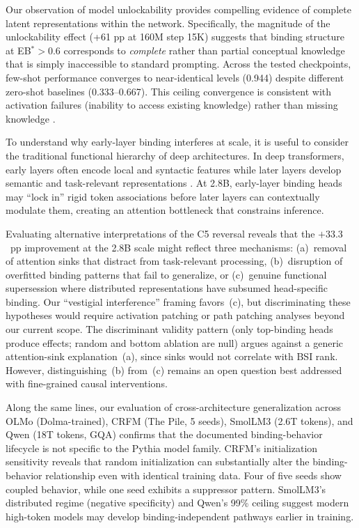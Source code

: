 \documentclass[10pt]{article} %
\begin{document}
Our observation of model unlockability provides compelling evidence of complete latent representations within the network.
Specifically, the magnitude of the unlockability effect (+61 pp at 160M step 15K) suggests that binding structure at EB$^*>0.6$ corresponds to \emph{complete} rather than partial conceptual knowledge that is simply inaccessible to standard prompting.
Across the tested checkpoints, few-shot performance converges to near-identical levels (0.944) despite different zero-shot baselines (0.333--0.667).
This ceiling convergence is consistent with activation failures (inability to access existing knowledge) rather than missing knowledge \citep{burns2022discovering}.

To understand why early-layer binding interferes at scale, it is useful to consider the traditional functional hierarchy of deep architectures.
In deep transformers, early layers often encode local and syntactic features while later layers develop semantic and task-relevant representations \citep{tenney2019bert,hewitt2019structural}.
At 2.8B, early-layer binding heads may ``lock in'' rigid token associations before later layers can contextually modulate them, creating an attention bottleneck that constrains inference.

Evaluating alternative interpretations of the C5 reversal reveals that the $+33.3$~pp improvement at the 2.8B scale might reflect three mechanisms: (a)~removal of attention sinks that distract from task-relevant processing, (b)~disruption of overfitted binding patterns that fail to generalize, or (c)~genuine functional supersession where distributed representations have subsumed head-specific binding.
Our ``vestigial interference'' framing favors~(c), but discriminating these hypotheses would require activation patching or path patching analyses beyond our current scope.
The discriminant validity pattern (only top-binding heads produce effects; random and bottom ablation are null) argues against a generic attention-sink explanation~(a), since sinks would not correlate with BSI rank.
However, distinguishing~(b) from~(c) remains an open question best addressed with fine-grained causal interventions.

Along the same lines, our evaluation of cross-architecture generalization across OLMo (Dolma-trained), CRFM (The Pile, 5 seeds), SmolLM3 (2.6T tokens), and Qwen (18T tokens, GQA) confirms that the documented binding-behavior lifecycle is not specific to the Pythia model family. 
CRFM's initialization sensitivity reveals that random initialization can substantially alter the binding-behavior relationship even with identical training data. Four of five seeds show coupled behavior, while one seed exhibits a suppressor pattern.
SmolLM3's distributed regime (negative specificity) and Qwen's 99\% ceiling suggest modern high-token models may develop binding-independent pathways earlier in training.
\end{document}
